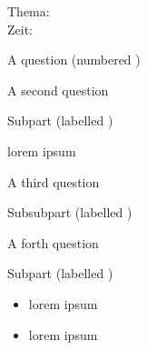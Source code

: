 \documentclass{../../exam2e}
\begin{document}

\begin{klassenarbeitskopf}
	Thema:\\
	Zeit:	
\end{klassenarbeitskopf}


\begin{questions}
	\question[4] A question (numbered \thequestion)

\question A second question
\begin{subparts}
	\subpart Subpart (labelled \thesubpart)
	\begin{subsubparts}
		\subsubpart lorem ipsum
	\end{subsubparts}
\end{subparts}

\clearpage

\question A third question
\begin{subsubparts}
	\subsubpart Subsubpart (labelled \thesubsubpart)
\end{subsubparts}

\question A forth question
\begin{subparts}
	\subpart[4] Subpart (labelled \thesubpart)
	\begin{itemize}
		\item lorem ipsum
		\item lorem ipsum
	\end{itemize}
\end{subparts}


\end{questions}

\clearpage
\addtocounter{page}{-1}
\thispagestyle{empty} 



\end{document}
